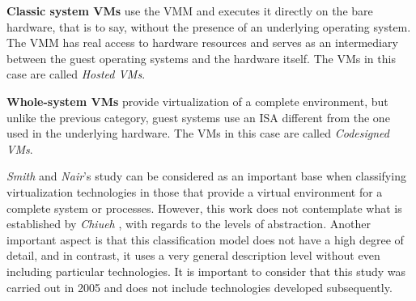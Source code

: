 
	\textbf{Classic system VMs} use the VMM and executes it directly on the bare hardware, that is to say, without the presence of an underlying operating system. The VMM  has real access to hardware resources and serves as an intermediary between the guest operating systems and the hardware itself. The VMs in this case are called \textit{Hosted VMs}.
		
	\textbf{Whole-system VMs} provide virtualization of a complete environment, but unlike the previous category, guest systems use an ISA different from the one used in the underlying hardware. The VMs in this case are called \textit{Codesigned VMs}.


	
	\textit{Smith} and \textit{Nair}'s study \cite{Smith2005} can be considered as an important base when classifying virtualization technologies in those that provide a virtual environment for a complete system or processes. However, this work does not contemplate what is established by \textit{Chiueh} \cite{Chiueh2005}, with regards to the levels of abstraction. Another important aspect is that this classification model does not have a high degree of detail, and in contrast, it uses a very general description level without even including particular technologies. It is important to consider that this study was carried out in 2005 and does not include technologies developed  subsequently.
	
